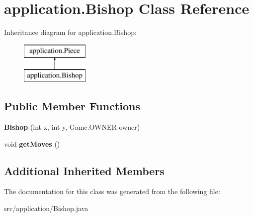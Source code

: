 \hypertarget{classapplication_1_1_bishop}{\section{application.\+Bishop Class Reference}
\label{classapplication_1_1_bishop}
}
Inheritance diagram for application.\+Bishop\+:\begin{figure}[H]
\begin{center}
\leavevmode
\includegraphics[height=2.000000cm]{classapplication_1_1_bishop}
\end{center}
\end{figure}
\subsection*{Public Member Functions}
\begin{DoxyCompactItemize}
\item 
\hypertarget{classapplication_1_1_bishop_a824e813916e5f1457225e6374c5a102b}{{\bfseries Bishop} (int x, int y, Game.\+O\+W\+N\+E\+R owner)}\label{classapplication_1_1_bishop_a824e813916e5f1457225e6374c5a102b}

\item 
\hypertarget{classapplication_1_1_bishop_a2b4021dea2118daf0647a19b610d83d9}{void {\bfseries get\+Moves} ()}\label{classapplication_1_1_bishop_a2b4021dea2118daf0647a19b610d83d9}

\end{DoxyCompactItemize}
\subsection*{Additional Inherited Members}


The documentation for this class was generated from the following file\+:\begin{DoxyCompactItemize}
\item 
src/application/Bishop.\+java\end{DoxyCompactItemize}
